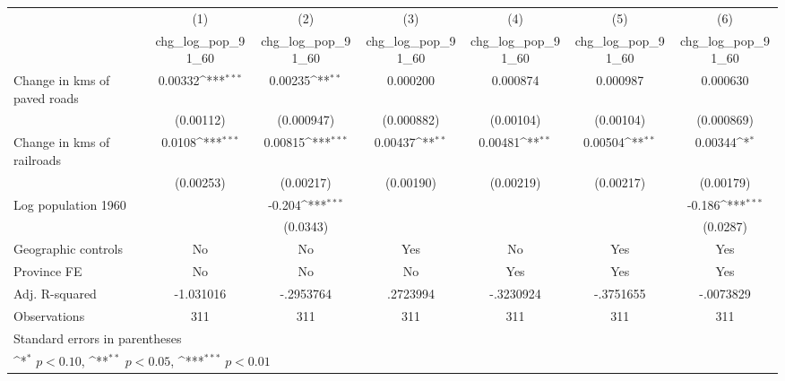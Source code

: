{
\def\sym#1{\ifmmode^{#1}\else\(^{#1}\)\fi}
\begin{tabular}{l*{6}{c}}
\hline\hline
                    &\multicolumn{1}{c}{(1)}&\multicolumn{1}{c}{(2)}&\multicolumn{1}{c}{(3)}&\multicolumn{1}{c}{(4)}&\multicolumn{1}{c}{(5)}&\multicolumn{1}{c}{(6)}\\
                    &\multicolumn{1}{c}{chg\_log\_pop\_91\_60}&\multicolumn{1}{c}{chg\_log\_pop\_91\_60}&\multicolumn{1}{c}{chg\_log\_pop\_91\_60}&\multicolumn{1}{c}{chg\_log\_pop\_91\_60}&\multicolumn{1}{c}{chg\_log\_pop\_91\_60}&\multicolumn{1}{c}{chg\_log\_pop\_91\_60}\\
\hline
Change in kms of paved roads&     0.00332\sym{***}&     0.00235\sym{**} &    0.000200         &    0.000874         &    0.000987         &    0.000630         \\
                    &   (0.00112)         &  (0.000947)         &  (0.000882)         &   (0.00104)         &   (0.00104)         &  (0.000869)         \\
[1em]
Change in kms of railroads&      0.0108\sym{***}&     0.00815\sym{***}&     0.00437\sym{**} &     0.00481\sym{**} &     0.00504\sym{**} &     0.00344\sym{*}  \\
                    &   (0.00253)         &   (0.00217)         &   (0.00190)         &   (0.00219)         &   (0.00217)         &   (0.00179)         \\
[1em]
Log population 1960 &                     &      -0.204\sym{***}&                     &                     &                     &      -0.186\sym{***}\\
                    &                     &    (0.0343)         &                     &                     &                     &    (0.0287)         \\
\hline
Geographic controls &          No         &          No         &         Yes         &          No         &         Yes         &         Yes         \\
Province FE         &          No         &          No         &          No         &         Yes         &         Yes         &         Yes         \\
Adj. R-squared      &   -1.031016         &   -.2953764         &    .2723994         &   -.3230924         &   -.3751655         &   -.0073829         \\
Observations        &         311         &         311         &         311         &         311         &         311         &         311         \\
\hline\hline
\multicolumn{7}{l}{\footnotesize Standard errors in parentheses}\\
\multicolumn{7}{l}{\footnotesize \sym{*} \(p<0.10\), \sym{**} \(p<0.05\), \sym{***} \(p<0.01\)}\\
\end{tabular}
}
